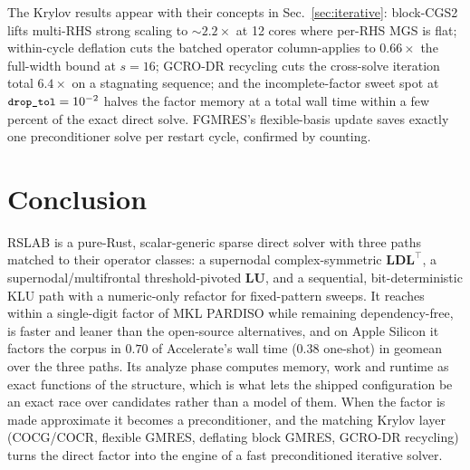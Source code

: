 \documentclass[11pt,a4paper]{article}
\newcommand{\rT}{\textsf{RSLAB}}
\newcommand{\code}[1]{\texttt{\small #1}}
\newcommand{\LDLt}{\mathbf{L}\mathbf{D}\mathbf{L}^{\!\top}}
\newcommand{\LU}{\mathbf{L}\mathbf{U}}
\begin{document}
The Krylov results appear with their concepts in Sec.~\ref{sec:iterative}: block-CGS2
lifts multi-RHS strong scaling to $\sim2.2\times$ at 12 cores where per-RHS MGS is flat; within-cycle deflation cuts the batched operator
column-applies to $0.66\times$ the full-width bound at $s=16$; GCRO-DR recycling cuts
the cross-solve iteration total $6.4\times$ on a stagnating sequence; and the
incomplete-factor sweet spot at $\code{drop\_tol}=10^{-2}$ halves the factor memory at a
total wall time within a few percent of the exact direct solve. FGMRES's flexible-basis
update saves exactly one preconditioner solve per restart cycle, confirmed by counting.

\section{Conclusion}
\rT{} is a pure-Rust, scalar-generic sparse direct solver with three paths matched to
their operator classes: a supernodal complex-symmetric $\LDLt$, a supernodal/multifrontal
threshold-pivoted $\LU$, and a sequential, bit-deterministic KLU path with a numeric-only
refactor for fixed-pattern sweeps. It reaches within a single-digit factor of MKL PARDISO
while remaining dependency-free, is faster and leaner than the open-source alternatives,
and on Apple Silicon it factors the corpus in $0.70$ of Accelerate's wall time
($0.38$ one-shot) in geomean over the three paths. Its analyze phase computes memory,
work and runtime as exact functions of the structure, which is what lets the shipped
configuration be an exact race over candidates rather than a model of them. When the factor is made
approximate it becomes a preconditioner, and the matching Krylov layer (COCG/COCR,
flexible GMRES, deflating block GMRES, GCRO-DR recycling) turns the direct factor into
the engine of a fast preconditioned iterative solver.
\end{document}
